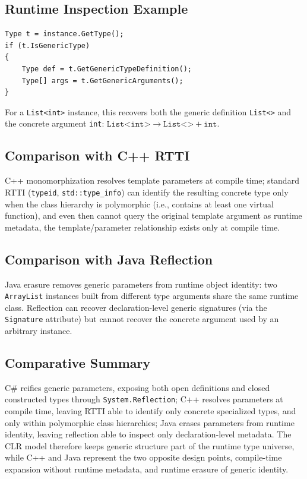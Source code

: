 \documentclass[11pt]{report}
\begin{document}
\subsection{Runtime Inspection Example}

\begin{examplebox}

\begin{lstlisting}[language=CSharp]
Type t = instance.GetType();
if (t.IsGenericType)
{
    Type def = t.GetGenericTypeDefinition();
    Type[] args = t.GetGenericArguments();
}
\end{lstlisting}

For a \texttt{List<int>} instance, this recovers both the generic
definition \texttt{List<>} and the concrete argument \texttt{int}:
$\texttt{List<int>} \rightarrow \texttt{List<>} + \texttt{int}$.
\end{examplebox}

\subsection{Comparison with C++ RTTI}
\label{CSharpGenerics:Reflection:ComparisonCpp}

C++ monomorphization resolves template parameters at compile time;
standard RTTI (\texttt{typeid}, \texttt{std::type\_info}) can identify the
resulting concrete type only when the class hierarchy is polymorphic
(i.e., contains at least one virtual function), and even then cannot
query the original template argument as runtime metadata, the
template/parameter relationship exists only at compile time.

\subsection{Comparison with Java Reflection}

Java erasure removes generic parameters from runtime object identity: two
\texttt{ArrayList} instances built from different type arguments share the
same runtime class. Reflection can recover declaration-level generic
signatures (via the \texttt{Signature} attribute) but cannot recover the
concrete argument used by an arbitrary instance.

\subsection{Comparative Summary}
\label{CSharpGenerics:Reflection:Summary}

C\# reifies generic parameters, exposing both open definitions and closed
constructed types through \texttt{System.Reflection}; C++ resolves
parameters at compile time, leaving RTTI able to identify only concrete
specialized types, and only within polymorphic class hierarchies; Java
erases parameters from runtime identity, leaving reflection able to
inspect only declaration-level metadata. The CLR model therefore keeps
generic structure part of the runtime type universe, while C++ and Java
represent the two opposite design points, compile-time expansion
without runtime metadata, and runtime erasure of generic identity.
\end{document}

